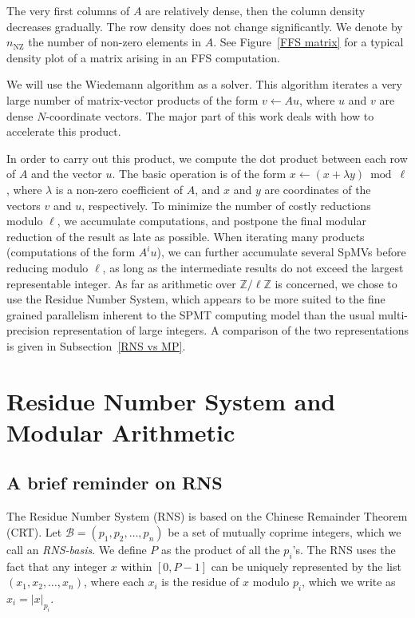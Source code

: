 \documentclass[runningheads,orivec]{llncs}
\begin{document}
The very first columns of $A$ are relatively dense, then the column density decreases gradually. The row density does not change significantly. We denote by $n_{\mathrm{NZ}}$ the number of non-zero elements in $A$. See Figure~\ref{FFS matrix} for a typical density plot of a matrix arising in an FFS computation.


We will use the Wiedemann algorithm as a solver. This algorithm iterates a very large number of matrix-vector products of the form $v \leftarrow Au$, where $u$ and $v$ are dense $N$-coordinate vectors. The major part of this work deals with how to accelerate this product.

In order to carry out this product, we compute the dot product between each row of $A$ and the vector $u$. The basic operation is of the form $x \leftarrow (x + \lambda y) \bmod \ell$, where $\lambda$ is a non-zero coefficient of $A$, and $x$ and $y$ are coordinates of the vectors $v$ and $u$, respectively. To minimize the number of costly reductions modulo $\ell$, we accumulate computations, and postpone the final modular reduction of the result as late as possible. When iterating many products (computations of the form $A^i u$), we can further accumulate several SpMVs before reducing modulo $\ell$, as long as the intermediate results do not exceed the largest representable integer. As far as arithmetic over $\mathbb{Z}/\ell\mathbb{Z}$ is concerned, we chose to use the Residue Number System, which appears to be more suited to the fine grained parallelism inherent to the SPMT computing model than the usual multi-precision representation of large integers. A comparison of the two representations is given in Subsection~\ref{RNS vs MP}.

\vspace*{-0.25cm}
\section{Residue Number System and Modular Arithmetic}
\label{RNS}

\vspace*{-0.25cm}

\subsection{A brief reminder on RNS}
\vspace*{-0.25cm}

The Residue Number System (RNS) is based on the Chinese Remainder Theorem (CRT). Let $\mathcal{B}=(p_1,p_2,\dots,p_n)$ be a set of mutually coprime integers, which we call an \textit{RNS-basis}. We define $P$ as the product of all the $p_i$'s. The RNS uses the fact that any integer $x$ within $[0, P-1]$ can be uniquely represented by the list $(x_1,x_2,\dots,x_n)$, where each $x_i$ is the residue of $x$ modulo $p_i$, which we write as $x_i = |x|_{p_i}$. 
\end{document}
